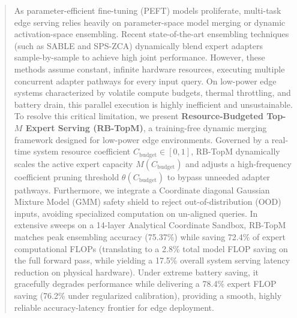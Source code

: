 \begin{abstract}
As parameter-efficient fine-tuning (PEFT) models proliferate, multi-task edge serving relies heavily on parameter-space model merging or dynamic activation-space ensembling. Recent state-of-the-art ensembling techniques (such as SABLE and SPS-ZCA) dynamically blend expert adapters sample-by-sample to achieve high joint performance. However, these methods assume constant, infinite hardware resources, executing multiple concurrent adapter pathways for every input query. On low-power edge systems characterized by volatile compute budgets, thermal throttling, and battery drain, this parallel execution is highly inefficient and unsustainable. To resolve this critical limitation, we present \textbf{Resource-Budgeted Top-$M$ Expert Serving (RB-TopM)}, a training-free dynamic merging framework designed for low-power edge environments. Governed by a real-time system resource coefficient $C_{\text{budget}} \in [0, 1]$, RB-TopM dynamically scales the active expert capacity $M(C_{\text{budget}})$ and adjusts a high-frequency coefficient pruning threshold $\theta(C_{\text{budget}})$ to bypass unneeded adapter pathways. Furthermore, we integrate a Coordinate diagonal Gaussian Mixture Model (GMM) safety shield to reject out-of-distribution (OOD) inputs, avoiding specialized computation on un-aligned queries. In extensive sweeps on a 14-layer Analytical Coordinate Sandbox, RB-TopM matches peak ensembling accuracy (75.37\%) while saving 72.4\% of expert computational FLOPs (translating to a 2.8\% total model FLOP saving on the full forward pass, while yielding a 17.5\% overall system serving latency reduction on physical hardware). Under extreme battery saving, it gracefully degrades performance while delivering a 78.4\% expert FLOP saving (76.2\% under regularized calibration), providing a smooth, highly reliable accuracy-latency frontier for edge deployment.
\end{abstract}
